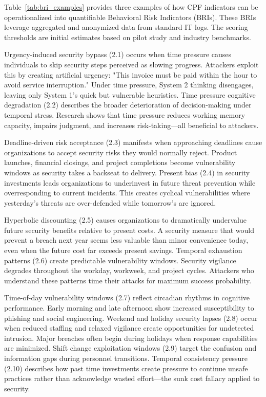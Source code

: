 \documentclass[manuscript,screen,review]{acmart}
\begin{document}
\noindent Table~\ref{tab:bri_examples} provides three examples of how CPF indicators can be operationalized into quantifiable Behavioral Risk Indicators (BRIs). These BRIs leverage aggregated and anonymized data from standard IT logs. The scoring thresholds are initial estimates based on pilot study and industry benchmarks.

Urgency-induced security bypass (2.1) occurs when time pressure causes individuals to skip security steps perceived as slowing progress. Attackers exploit this by creating artificial urgency: "This invoice must be paid within the hour to avoid service interruption." Under time pressure, System 2 thinking disengages, leaving only System 1's quick but vulnerable heuristics. Time pressure cognitive degradation (2.2) describes the broader deterioration of decision-making under temporal stress. Research shows that time pressure reduces working memory capacity, impairs judgment, and increases risk-taking—all beneficial to attackers.

Deadline-driven risk acceptance (2.3) manifests when approaching deadlines cause organizations to accept security risks they would normally reject. Product launches, financial closings, and project completions become vulnerability windows as security takes a backseat to delivery. Present bias (2.4) in security investments leads organizations to underinvest in future threat prevention while overresponding to current incidents. This creates cyclical vulnerabilities where yesterday's threats are over-defended while tomorrow's are ignored.

Hyperbolic discounting (2.5) causes organizations to dramatically undervalue future security benefits relative to present costs. A security measure that would prevent a breach next year seems less valuable than minor convenience today, even when the future cost far exceeds present savings. Temporal exhaustion patterns (2.6) create predictable vulnerability windows. Security vigilance degrades throughout the workday, workweek, and project cycles. Attackers who understand these patterns time their attacks for maximum success probability.

Time-of-day vulnerability windows (2.7) reflect circadian rhythms in cognitive performance. Early morning and late afternoon show increased susceptibility to phishing and social engineering. Weekend and holiday security lapses (2.8) occur when reduced staffing and relaxed vigilance create opportunities for undetected intrusion. Major breaches often begin during holidays when response capabilities are minimized. Shift change exploitation windows (2.9) target the confusion and information gaps during personnel transitions. Temporal consistency pressure (2.10) describes how past time investments create pressure to continue unsafe practices rather than acknowledge wasted effort—the sunk cost fallacy applied to security.
\end{document}
